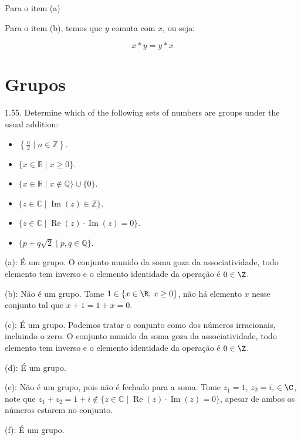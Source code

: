 \begin{solucao}
	Para o item (a)

	Para o item (b), temos que \(y\) comuta com \(x\), ou seja:

	\[x * y = y * x\]
\end{solucao}

\section{Grupos}

\begin{exercicio}{1.55.} 
	Determine which of the following sets of numbers are groups under the usual addition:

	\begin{itemize}
		\item[(a)] $\left\{\frac{n}{2} \mid n \in \mathbb{Z} \right\}$.
		\item[(b)] $\{x \in \mathbb{R} \mid x \geq 0\}$.
		\item[(c)] $\{x \in \mathbb{R} \mid x \notin \mathbb{Q} \} \cup \{0\}$.
		\item[(d)] $\{z \in \mathbb{C} \mid \operatorname{Im}(z) \in \mathbb{Z} \}$.
		\item[(e)] $\{z \in \mathbb{C} \mid \operatorname{Re}(z) \cdot \operatorname{Im}(z) = 0\}$.
		\item[(f)] $\{ p + q \sqrt{2} \mid p, q \in \mathbb{Q} \}$.
	\end{itemize}
\end{exercicio}

\begin{solucao}
	(a): É um grupo. O conjunto munido da soma goza da associatividade, todo elemento tem inverso e o elemento identidade da operação é \(0 \in \Z\).

	(b): Não é um grupo. Tome \(1 \in \{x \in \R; \, x \geq 0\}\), não há elemento \(x\) nesse conjunto tal que \(x + 1 = 1 + x = 0\).

	(c): É um grupo. Podemos tratar o conjunto como dos números irracionais, incluindo o zero. O conjunto munido da soma goza da associatividade, todo elemento tem inverso e o elemento identidade da operação é \(0 \in \Z\).

	(d): É um grupo.

	(e): Não é um grupo, pois não é fechado para a soma. Tome \(z_1 = 1\), \(z_2 = i, \, \in \C\), note que \(z_1 + z_2 = 1 + i \not \in \{z \in \mathbb{C} \mid \operatorname{Re}(z) \cdot \operatorname{Im}(z) = 0\}\), apesar de ambos os números estarem no conjunto.

	(f): É um grupo.
\end{solucao}

